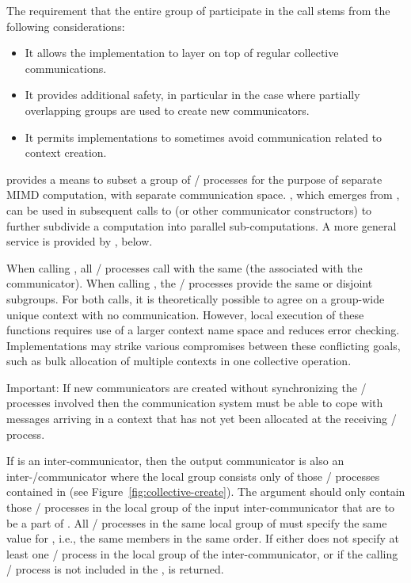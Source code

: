 \begin{rationale}
The requirement that the entire group of  participate in the call
stems from the following considerations:
\begin{itemize}
\item
It allows the implementation to layer  on top of
regular collective communications.
\item
It provides additional safety, in particular in the case where partially
overlapping groups are used to create new communicators.
\item
It permits implementations to
sometimes avoid communication related to
context
creation.
\end{itemize}
\end{rationale}

\begin{users}
 provides a means to subset a group of \MPI/ processes for the
purpose of separate MIMD computation, with separate communication space.
, which emerges from
, can be used in
subsequent calls to  (or other communicator
constructors) to
further subdivide a computation into
parallel sub-computations. A more general service is provided by
, below.
\end{users}

\begin{implementors}
When calling , all \MPI/ processes call with the same 
(the  associated with the communicator).
When calling , the \MPI/ processes provide the
same  or disjoint subgroups. For both calls, it is theoretically possible
to agree on a group-wide unique context with no communication.
However, local execution of these functions requires
use of a larger context name space and reduces error checking.
Implementations may strike various compromises between these
conflicting goals, such as bulk allocation of multiple contexts in one
collective operation.

Important: If new communicators are created without synchronizing the
\MPI/ processes involved then the communication system
must be able to cope with
messages arriving in a context that has not yet been allocated at the
receiving \MPI/ process.
\end{implementors}

\noindent If  is an
inter-communicator, then the output communicator is also an
inter\hyphen/communicator
where the local group consists only of those \MPI/ processes contained in
 (see Figure~\ref{fig:collective-create}). The 
argument should only contain those \MPI/ processes in the local group of the input
inter-communicator that are to be a part of .
All \MPI/ processes in the same local group of  must specify the same value for
, i.e., the same members in the same order.
If either
 does not specify at least one \MPI/ process in the local group of
the inter-communicator, or if the calling \MPI/ process is not included in the
,  is returned.

